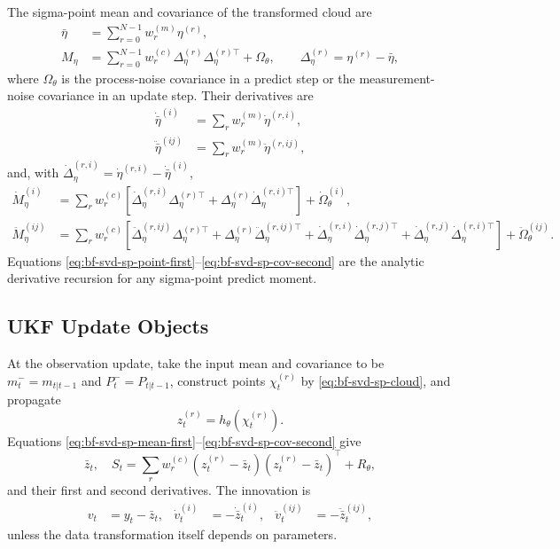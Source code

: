 The sigma-point mean and covariance of the transformed cloud are
\begin{align}
\label{eq:bf-svd-sp-transformed-mean}
  \bar\eta &= \sum_{r=0}^{N-1} w_r^{(m)}\eta^{(r)},\\
\label{eq:bf-svd-sp-transformed-cov}
  M_\eta &= \sum_{r=0}^{N-1}w_r^{(c)}
    \Delta_\eta^{(r)}\Delta_\eta^{(r)\top}+\Omega_\theta,
  \qquad
  \Delta_\eta^{(r)}=\eta^{(r)}-\bar\eta,
\end{align}
where $\Omega_\theta$ is the process-noise covariance in a predict step or the
measurement-noise covariance in an update step.  Their derivatives are
\begin{align}
\label{eq:bf-svd-sp-mean-first}
  \dot{\bar\eta}^{(i)}
  &=\sum_r w_r^{(m)}\dot\eta^{(r,i)},\\
\label{eq:bf-svd-sp-mean-second}
  \ddot{\bar\eta}^{(ij)}
  &=\sum_r w_r^{(m)}\ddot\eta^{(r,ij)},
\end{align}
and, with
$\dot\Delta_\eta^{(r,i)}=\dot\eta^{(r,i)}-\dot{\bar\eta}^{(i)}$,
\begin{align}
\label{eq:bf-svd-sp-cov-first}
  \dot M_\eta^{(i)}
  &=
  \sum_r w_r^{(c)}
  \left[
    \dot\Delta_\eta^{(r,i)}\Delta_\eta^{(r)\top}
    +\Delta_\eta^{(r)}\dot\Delta_\eta^{(r,i)\top}
  \right]
  +\dot\Omega_\theta^{(i)},\\
\label{eq:bf-svd-sp-cov-second}
  \ddot M_\eta^{(ij)}
  &=
  \sum_r w_r^{(c)}
  \left[
    \ddot\Delta_\eta^{(r,ij)}\Delta_\eta^{(r)\top}
    +\Delta_\eta^{(r)}\ddot\Delta_\eta^{(r,ij)\top}
    +\dot\Delta_\eta^{(r,i)}\dot\Delta_\eta^{(r,j)\top}
    +\dot\Delta_\eta^{(r,j)}\dot\Delta_\eta^{(r,i)\top}
  \right]
  +\ddot\Omega_\theta^{(ij)} .
\end{align}
Equations
\eqref{eq:bf-svd-sp-point-first}--\eqref{eq:bf-svd-sp-cov-second}
are the analytic derivative recursion for any sigma-point predict moment.

\subsection{UKF Update Objects}
\label{sec:bf-svd-sp-update-objects}

At the observation update, take the input mean and covariance to be
$m_t^-=m_{t|t-1}$ and $P_t^-=P_{t|t-1}$, construct points
$\chi_t^{(r)}$ by \eqref{eq:bf-svd-sp-cloud}, and propagate
\[
  z_t^{(r)}=h_\theta(\chi_t^{(r)}).
\]
Equations \eqref{eq:bf-svd-sp-mean-first}--\eqref{eq:bf-svd-sp-cov-second}
give
\[
  \bar z_t,\quad
  S_t=\sum_r w_r^{(c)}
    (z_t^{(r)}-\bar z_t)(z_t^{(r)}-\bar z_t)^\top+R_\theta,
\]
and their first and second derivatives.  The innovation is
\begin{align}
\label{eq:bf-svd-sp-innovation-derivatives}
  v_t &= y_t-\bar z_t, &
  \dot v_t^{(i)} &= -\dot{\bar z}_t^{(i)}, &
  \ddot v_t^{(ij)} &= -\ddot{\bar z}_t^{(ij)},
\end{align}
unless the data transformation itself depends on parameters.

